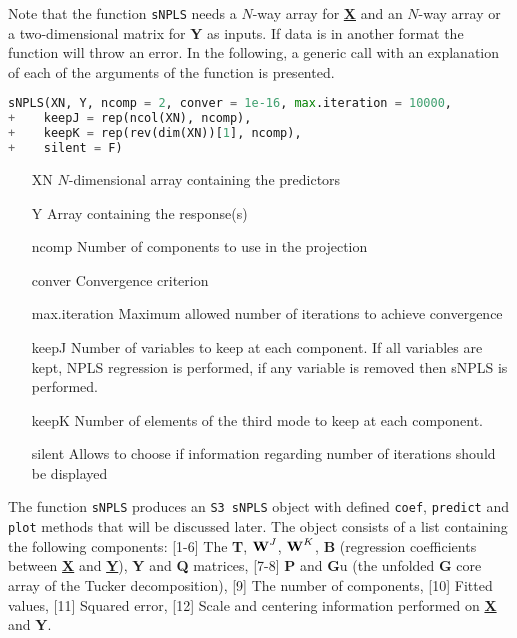 Note that the function \texttt{sNPLS} needs a $N$-way array for \textbf{\underline{X}} and an $N$-way array or a two-dimensional matrix for \textbf{Y} as inputs. If data is in another format the function will throw an error. In the following, a generic call with an explanation of each of the arguments of the function is presented.
\vspace{15pt}
\begin{lstlisting}[basicstyle=\small, language=Python]
sNPLS(XN, Y, ncomp = 2, conver = 1e-16, max.iteration = 10000,
+    keepJ = rep(ncol(XN), ncomp), 
+    keepK = rep(rev(dim(XN))[1], ncomp),
+    silent = F)
\end{lstlisting}
\vspace{10pt}
\begin{itemize}[leftmargin=2.5cm]
\item[XN] $N$-dimensional array containing the predictors
\item[Y] Array containing the response(s)
\item[ncomp] Number of components to use in the projection
\item[conver] Convergence criterion
\item[max.iteration] Maximum allowed number of iterations to achieve convergence
\item[keepJ] Number of variables to keep at each component. If all variables are kept, NPLS regression is performed, if any variable is removed then sNPLS is performed.
\item[keepK] Number of elements of the third mode to keep at each component.
\item[silent] Allows to choose if information regarding number of iterations should be displayed
\end{itemize}
\vspace{7pt}
The function \texttt{sNPLS} produces an \texttt{S3 sNPLS} object with defined \texttt{coef}, \texttt{predict} and \texttt{plot} methods that will be discussed later. The object consists of a list containing the following components: [1-6] The \textbf{T}, $\textbf{\text{W}}^{J}$, $\textbf{\text{W}}^{K}$, \textbf{B} (regression coefficients between \textbf{\underline{X}} and \textbf{\underline{Y}}), \textbf{Y} and \textbf{Q} matrices, [7-8] \textbf{P} and \textbf{G}u (the unfolded \textbf{G} core array of the Tucker decomposition), [9] The number of components, [10] Fitted values, [11] Squared error, [12] Scale and centering information performed on \textbf{\underline{X}} and \textbf{Y}.

